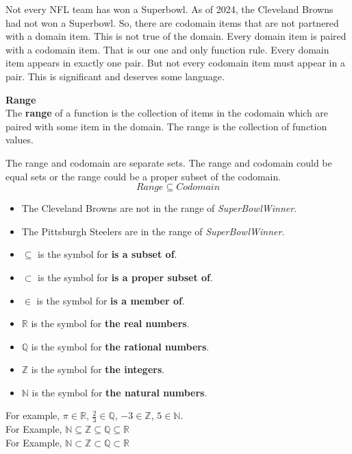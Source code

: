 \documentclass{ximera}
\begin{document}
Not every NFL team has won a Superbowl. As of 2024, the Cleveland Browns had not won a Superbowl.  So, there are codomain items that are not partnered with a domain item.  This is not true of the domain.  Every domain item is paired with a codomain item.  That is our one and only function rule.  Every domain item appears in exactly one pair.  But not every codomain item must appear in a pair.  This is significant and deserves some language.


\begin{definition} \textbf{\textcolor{green!50!black}{Range}} \\

The \textbf{range} of a function is the collection of items in the codomain which are paired with some item in the domain.  The range is the collection of function values.
\end{definition}

The range and codomain are separate sets.  The range and codomain could be equal sets or the range could be a proper subset of the codomain. \\

\[  Range \subseteq Codomain\]

\begin{itemize}
\item The Cleveland Browns are not in the range of \textit{SuperBowlWinner}.  
\item The Pittsburgh Steelers are in the range of \textit{SuperBowlWinner}.
\end{itemize}



\begin{notation}
\begin{itemize}
\item $\subseteq$ is the symbol for \textbf{is a subset of}.
\item $\subset$ is the symbol for \textbf{is a proper subset of}.
\item $\in$ is the symbol for \textbf{is a member of}.
\item $\mathbb{R}$ is the symbol for \textbf{the real numbers}.
\item $\mathbb{Q}$ is the symbol for \textbf{the rational numbers}.
\item $\mathbb{Z}$ is the symbol for \textbf{the integers}.
\item $\mathbb{N}$ is the symbol for \textbf{the natural numbers}.
\end{itemize}


For example, $\pi \in \mathbb{R}$, $\tfrac{2}{3} \in \mathbb{Q}$, $-3 \in \mathbb{Z}$, $5 \in \mathbb{N}$. \\

For Example,  $\mathbb{N} \subseteq \mathbb{Z} \subseteq \mathbb{Q} \subseteq \mathbb{R}$ \\

For Example,  $\mathbb{N} \subset \mathbb{Z} \subset \mathbb{Q} \subset \mathbb{R}$


\end{notation}
\end{document}
